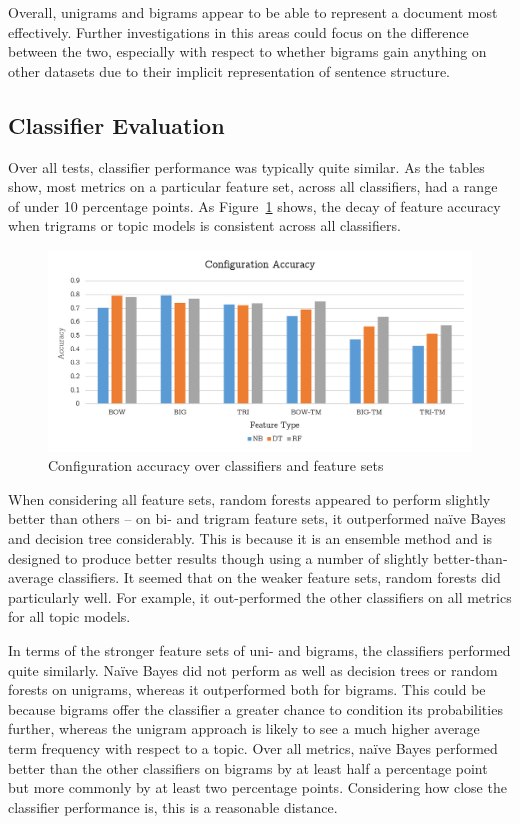 \documentclass[11pt]{article}
\begin{document}
Overall, unigrams and bigrams appear to be able to represent a document most effectively. Further investigations in this areas could focus on the difference between the two, especially with respect to whether bigrams gain anything on other datasets due to their implicit representation of sentence structure.

\subsection{Classifier Evaluation}
Over all tests, classifier performance was typically quite similar. As the tables show, most metrics on a particular feature set, across all classifiers, had a range of under 10 percentage points. As Figure~\ref{chart} shows, the decay of feature accuracy when trigrams or topic models is consistent across all classifiers. 

\begin{figure}
\begin{center}
\includegraphics[scale=0.8]{chart}
\end{center}
\caption{Configuration accuracy over classifiers and feature sets}
\label{chart}
\end{figure}

When considering all feature sets, random forests appeared to perform slightly better than others – on bi- and trigram feature sets, it outperformed naïve Bayes and decision tree considerably. This is because it is an ensemble method and is designed to produce better results though using a number of slightly better-than-average classifiers. It seemed that on the weaker feature sets, random forests did particularly well. For example, it out-performed the other classifiers on all metrics for all topic models. 

In terms of the stronger feature sets of uni- and bigrams, the classifiers performed quite similarly. Naïve Bayes did not perform as well as decision trees or random forests on unigrams, whereas it outperformed both for bigrams. This could be because bigrams offer the classifier a greater chance to condition its probabilities further, whereas the unigram approach is likely to see a much higher average term frequency with respect to a topic. Over all metrics, naïve Bayes performed better than the other classifiers on bigrams by at least half a percentage point but more commonly by at least two percentage points. Considering how close the classifier performance is, this is a reasonable distance.
\end{document}
